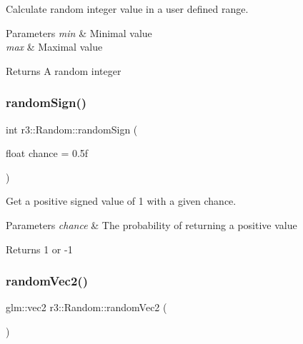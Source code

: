 Calculate random integer value in a user defined range. 


\begin{DoxyParams}{Parameters}
{\em min} & Minimal value \\
\hline
{\em max} & Maximal value \\
\hline
\end{DoxyParams}
\begin{DoxyReturn}{Returns}
A random integer 
\end{DoxyReturn}
\mbox{\label{classr3_1_1_random_a27bd8d68f82223df0421bc309e83647f}} 
\subsubsection{\texorpdfstring{random\+Sign()}{randomSign()}}
{\footnotesize\ttfamily int r3\+::\+Random\+::random\+Sign (\begin{DoxyParamCaption}\item[{float}]{chance = {\ttfamily 0.5f} }\end{DoxyParamCaption})\hspace{0.3cm}{\ttfamily [static]}}



Get a positive signed value of 1 with a given chance. 


\begin{DoxyParams}{Parameters}
{\em chance} & The probability of returning a positive value \\
\hline
\end{DoxyParams}
\begin{DoxyReturn}{Returns}
1 or -\/1 
\end{DoxyReturn}
\mbox{\label{classr3_1_1_random_af52bb4270520c41c040d037ba88a8641}} 
\subsubsection{\texorpdfstring{random\+Vec2()}{randomVec2()}\hspace{0.1cm}{\footnotesize\ttfamily [1/3]}}
{\footnotesize\ttfamily glm\+::vec2 r3\+::\+Random\+::random\+Vec2 (\begin{DoxyParamCaption}{ }\end{DoxyParamCaption})\hspace{0.3cm}{\ttfamily [static]}}



